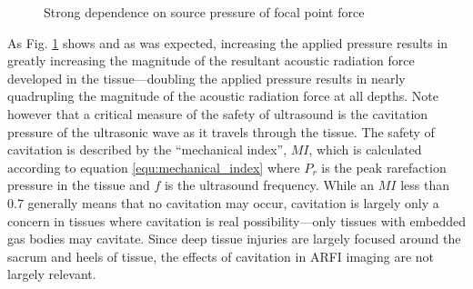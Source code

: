 			\begin{figure}[!htb]
				\centering
				\caption[Strong dependence on source pressure of focal point force]{Strong dependence on source pressure of focal point force}
				\label{fig:pressure_force}
			\end{figure}

			As Fig. \ref{fig:pressure_force} shows and as was expected, increasing the applied pressure results in greatly increasing the magnitude of the resultant acoustic radiation force developed in the tissue---doubling the applied pressure results in nearly quadrupling the magnitude of the acoustic radiation force at all depths. Note however that a critical measure of the safety of ultrasound is the cavitation pressure of the ultrasonic wave as it travels through the tissue. The safety of cavitation is described by the ``mechanical index'', $MI$, which is calculated according to equation \ref{equ:mechanical_index} \cite{hoskins10} where $P_r$ is the peak rarefaction pressure in the tissue and $f$ is the ultrasound frequency. While an $MI$ less than 0.7 generally means that no cavitation may occur, cavitation is largely only a concern in tissues where cavitation is real possibility---only tissues with embedded gas bodies may cavitate. Since deep tissue injuries are largely focused around the sacrum and heels of tissue, the effects of cavitation in ARFI imaging are not largely relevant.


